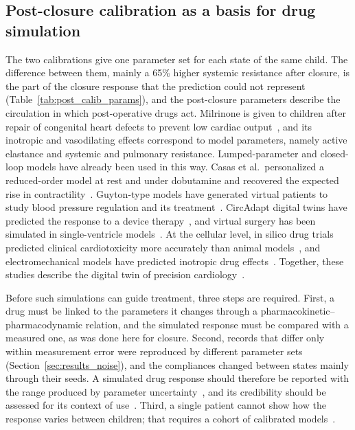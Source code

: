 \subsection{Post-closure calibration as a basis for drug simulation}
\label{sec:disc_drug}
The two calibrations give one parameter set for each state of the same child. The difference between them, mainly a 65\% higher systemic resistance after closure, is the part of the closure response that the prediction could not represent (Table~\ref{tab:post_calib_params}), and the post-closure parameters describe the circulation in which post-operative drugs act. Milrinone is given to children after repair of congenital heart defects to prevent low cardiac output~\cite{Hoffman2003}, and its inotropic and vasodilating effects correspond to model parameters, namely active elastance and systemic and pulmonary resistance. Lumped-parameter and closed-loop models have already been used in this way. Casas et al.\ personalized a reduced-order model at rest and under dobutamine and recovered the expected rise in contractility~\cite{Casas2018}. Guyton-type models have generated virtual patients to study blood pressure regulation and its treatment~\cite{Moss2012}. CircAdapt digital twins have predicted the response to a device therapy~\cite{Koopsen2024}, and virtual surgery has been simulated in single-ventricle models~\cite{Corsini2014}. At the cellular level, in silico drug trials predicted clinical cardiotoxicity more accurately than animal models~\cite{Passini2017}, and electromechanical models have predicted inotropic drug effects~\cite{Margara2021}. Together, these studies describe the digital twin of precision cardiology~\cite{CorralAcero2020}.

Before such simulations can guide treatment, three steps are required. First, a drug must be linked to the parameters it changes through a pharmacokinetic--pharmacodynamic relation, and the simulated response must be compared with a measured one, as was done here for closure. Second, records that differ only within measurement error were reproduced by different parameter sets (Section~\ref{sec:results_noise}), and the compliances changed between states mainly through their seeds. A simulated drug response should therefore be reported with the range produced by parameter uncertainty~\cite{Schiavazzi2017,Colebank2024Guidelines}, and its credibility should be assessed for its context of use~\cite{Viceconti2021}. Third, a single patient cannot show how the response varies between children; that requires a cohort of calibrated models~\cite{Niederer2020,Niederer2021}.

